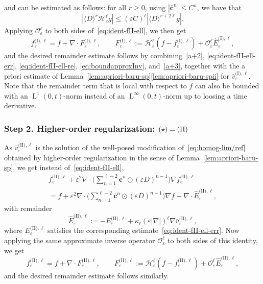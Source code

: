 \documentclass[JEP,XML,SOM,Unicode,published]{cedram}
\theoremstyle{plain}
\theoremstyle{definition}
\numberwithin{equation}{section}
\newcommand{\e}{\varepsilon}
\newcommand{\cc}{{\boldsymbol c}}
\newcommand{\Ld}{\operatorname{L}}
\newcommand{\step}[1]{\subsubsection*{Step \textup #1}}
\begin{document}
{{and can be estimated as follows{:} for all $r\ge0$, using $|\bar\cc^n|\le C^n$, {we have that}
\begin{equation}\label{a+3}
|\langle D\rangle^r\mathcal H_\e^\ell g| \le (\e C)^\ell | \langle D\rangle^{r+2\ell} g|. 
\end{equation}
Applying} $\mathcal O_\e^\ell$ to both sides of~\eqref{eq:ident-fII-ell}, we then get
\begin{equation*}
f_\e^{\text{(I)},\ell}=f+\nabla\cdot F_\e^{\text{(I)},\ell},
\qquad F_\e^{\text{(I)},\ell}:= \mathcal H_\e^\ell (f-f_\e^{\text{(I)},\ell})+\mathcal O_\e^\ell\hat E_\e^{\text{(I)},\ell},
\end{equation*}
and the desired remainder estimate follows by combining~\eqref{a+2}, \eqref{eq:ident-fII-ell-err}, \eqref{eq:ident-fII-ell-re}, \eqref{eq:boundapproxInv}, and~\eqref{a+3}, together with the a priori estimate of Lemma~\ref{lem:apriori-baru-sp}\eqref{lem:apriori-baru-spii} for $\bar v_\e^{\text{(I)},\ell}$. Note that the remainder term that is local with respect to $f$ can also be bounded with an $\Ld^1(0,t)$-norm instead of an $\Ld^\infty(0,t)$-norm up to loosing a time derivative.}

\step{2. High{er}-order regularization: $(\star)=\textup{(II)}$}
As $\bar v_\e^{\text{(II)},\ell}$ is the solution of the well-posed modification of~\eqref{eq:homog-lim/ref} obtained by higher-order regularization in the sense of Lemma~\ref{lem:apriori-baru-sp}, we get instead of~\eqref{eq:ident-fII-ell},\vspace*{-5pt}
\begin{multline*}
f_\e^{\text{(II)},\ell}+\e^2\nabla\cdot\Big(\sum_{n=1}^{\ell-2}\bar\cc^n\odot(\e D)^{n-1}\Big)\nabla f_\e^{\text{(II)},\ell}\\[-10pt]
=f+\e^2\nabla\cdot\Big(\sum_{n=1}^{\ell-2}\bar\cc^n\odot(\e D)^{n-1}\Big)\nabla f+\nabla\cdot\hat E_\e^{\text{(II)},\ell},
\end{multline*}
with remainder\vspace*{-3pt}
\begin{equation*}
\hat E_\e^{\text{(II)},\ell}:=-E_\e^{\text{(II)},\ell}+\kappa_\ell(\e|\nabla|)^{\ell}\nabla\bar v_\e^{\text{(II)},\ell},
\end{equation*}
where $E_\e^{\text{(II)},\ell}$ satisfies the corresponding estimate~\eqref{eq:ident-fII-ell-err}.
Now applying the same approximate inverse operator $\mathcal O_\e^\ell$ to both sides of this identity, we get\vspace*{-1pt}
\begin{equation*}
f_\e^{\text{(II)},\ell}=f+\nabla\cdot F_\e^{\text{(II)},\ell},
\qquad F_\e^{\text{(II)},\ell}:= \mathcal H_\e^\ell (f-f_\e^{\text{(II)},\ell})+\mathcal O_\e^\ell\hat E_\e^{\text{(II)},\ell},
\end{equation*}
and the desired remainder estimate follows similarly.
\end{document}
